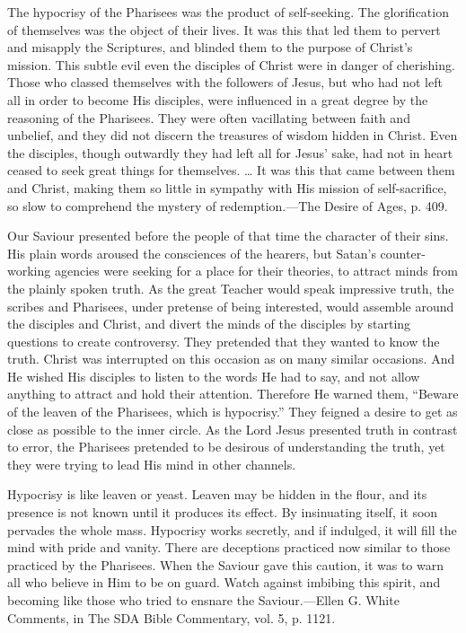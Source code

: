 \documentclass[a4paper, 10pt, twoside, headings=small]{scrartcl}
\begin{document}
\begin{multicols}{2}
The hypocrisy of the Pharisees was the product of self-seeking. The glorification of themselves was the object of their lives. It was this that led them to pervert and misapply the Scriptures, and blinded them to the purpose of Christ’s mission. This subtle evil even the disciples of Christ were in danger of cherishing. Those who classed themselves with the followers of Jesus, but who had not left all in order to become His disciples, were influenced in a great degree by the reasoning of the Pharisees. They were often vacillating between faith and unbelief, and they did not discern the treasures of wisdom hidden in Christ. Even the disciples, though outwardly they had left all for Jesus’ sake, had not in heart ceased to seek great things for themselves. … It was this that came between them and Christ, making them so little in sympathy with His mission of self-sacrifice, so slow to comprehend the mystery of redemption.—The Desire of Ages, p. 409.

Our Saviour presented before the people of that time the character of their sins. His plain words aroused the consciences of the hearers, but Satan’s counter-working agencies were seeking for a place for their theories, to attract minds from the plainly spoken truth. As the great Teacher would speak impressive truth, the scribes and Pharisees, under pretense of being interested, would assemble around the disciples and Christ, and divert the minds of the disciples by starting questions to create controversy. They pretended that they wanted to know the truth. Christ was interrupted on this occasion as on many similar occasions. And He wished His disciples to listen to the words He had to say, and not allow anything to attract and hold their attention. Therefore He warned them, “Beware of the leaven of the Pharisees, which is hypocrisy.” They feigned a desire to get as close as possible to the inner circle. As the Lord Jesus presented truth in contrast to error, the Pharisees pretended to be desirous of understanding the truth, yet they were trying to lead His mind in other channels.

Hypocrisy is like leaven or yeast. Leaven may be hidden in the flour, and its presence is not known until it produces its effect. By insinuating itself, it soon pervades the whole mass. Hypocrisy works secretly, and if indulged, it will fill the mind with pride and vanity. There are deceptions practiced now similar to those practiced by the Pharisees. When the Saviour gave this caution, it was to warn all who believe in Him to be on guard. Watch against imbibing this spirit, and becoming like those who tried to ensnare the Saviour.—Ellen G. White Comments, in The SDA Bible Commentary, vol. 5, p. 1121.


\end{multicols}
\end{document}
